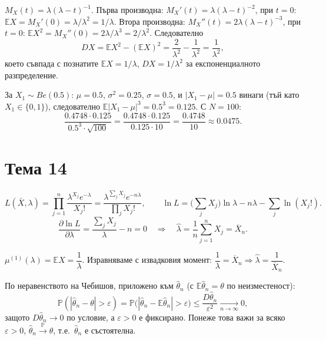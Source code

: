 \begin{proofbox}
$M_X(t)=\lambda(\lambda-t)^{-1}$. Първа производна: $M_X'(t)=
\lambda(\lambda-t)^{-2}$, при $t=0$: $\mathbb EX=M_X'(0)=\lambda/
\lambda^2=1/\lambda$. Втора производна: $M_X''(t)=2\lambda(\lambda-t)
^{-3}$, при $t=0$: $\mathbb EX^2=M_X''(0)=2\lambda/\lambda^3=2/
\lambda^2$. Следователно
\[
  DX = \mathbb EX^2-(\mathbb EX)^2 = \frac2{\lambda^2}-\frac1{
  \lambda^2} = \frac1{\lambda^2},
\]
което съвпада с познатите $\mathbb EX=1/\lambda$, $DX=1/\lambda^2$
за експоненциалното разпределение.
\end{proofbox}

\begin{proofbox}
За $X_1\sim Be(0.5)$: $\mu=0.5$, $\sigma^2=0.25$, $\sigma=0.5$, и
$|X_1-\mu|=0.5$ винаги (тъй като $X_1\in\{0,1\}$), следователно
$\mathbb E|X_1-\mu|^3 = 0.5^3=0.125$. С $N=100$:
\[
  \frac{0.4748\cdot0.125}{0.5^3\cdot\sqrt{100}} = \frac{0.4748\cdot
  0.125}{0.125\cdot10} = \frac{0.4748}{10} \approx 0.0475.
\]
\end{proofbox}

\section*{Тема 14}

\begin{proofbox}
\[
  L(\bar X,\lambda) = \prod_{j=1}^n \frac{\lambda^{X_j}e^{-\lambda}}
  {X_j!} = \frac{\lambda^{\sum_jX_j}e^{-n\lambda}}{\prod_jX_j!},
  \qquad \ln L = \Big(\sum_jX_j\Big)\ln\lambda - n\lambda - \sum_j
  \ln(X_j!).
\]
\[
  \frac{\partial\ln L}{\partial\lambda} = \frac{\sum_jX_j}\lambda -
  n = 0 \quad\Longrightarrow\quad \hat\lambda = \frac1n\sum_{j=1}^n
  X_j = \overline X_n.
\]
\end{proofbox}

\begin{proofbox}
$\mu^{(1)}(\lambda)=\mathbb EX=\dfrac1\lambda$. Изравняваме с
извадковия момент: $\dfrac1\lambda=\overline X_n \Rightarrow
\hat\lambda = \dfrac1{\overline X_n}$.
\end{proofbox}

\begin{proofbox}
По неравенството на Чебишов, приложено към $\hat\theta_n$ (с $\mathbb
E\hat\theta_n=\theta$ по неизместеност):
\[
  \mathbb P(|\hat\theta_n-\theta|>\varepsilon) = \mathbb P\big(|
  \hat\theta_n-\mathbb E\hat\theta_n|>\varepsilon\big) \le \frac{
  D\hat\theta_n}{\varepsilon^2} \xrightarrow[n\to\infty]{} 0,
\]
защото $D\hat\theta_n\to0$ по условие, а $\varepsilon>0$ е
фиксирано. Понеже това важи за всяко $\varepsilon>0$, $\hat\theta_n
\xrightarrow{\mathbb P}\theta$, т.е.\ $\hat\theta_n$ е състоятелна.
\qedbg
\end{proofbox}

